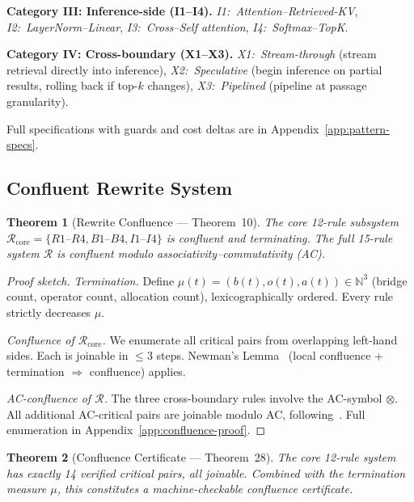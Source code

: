 \documentclass{article}
\newtheorem{theorem}{Theorem}
\theoremstyle{definition}
\theoremstyle{remark}
\begin{document}
\smallskip\noindent\textbf{Category III: Inference-side (I1--I4).}
\emph{I1:~Attention--Retrieved-KV}, \emph{I2:~LayerNorm--Linear}, \emph{I3:~Cross--Self attention}, \emph{I4:~Softmax--TopK}.

\smallskip\noindent\textbf{Category IV: Cross-boundary (X1--X3).}
\emph{X1:~Stream-through} (stream retrieval directly into inference),
\emph{X2:~Speculative} (begin inference on partial results, rolling back if top-$k$ changes),
\emph{X3:~Pipelined} (pipeline at passage granularity).

Full specifications with guards and cost deltas are in Appendix~\ref{app:pattern-specs}.

\subsection{Confluent Rewrite System}\label{sec:confluence}

\begin{theorem}[Rewrite Confluence --- Theorem~10]\label{thm:confluence}
The core 12-rule subsystem $\mathcal{R}_{\mathrm{core}} = \{R1\text{--}R4, B1\text{--}B4, I1\text{--}I4\}$ is confluent and terminating.
The full 15-rule system $\mathcal{R}$ is confluent modulo associativity--commutativity (AC).
\end{theorem}

\begin{proof}[Proof sketch]
\emph{Termination.}
Define $\mu(t) = (b(t), o(t), a(t)) \in \mathbb{N}^3$ (bridge count, operator count, allocation count), lexicographically ordered. Every rule strictly decreases $\mu$.

\emph{Confluence of $\mathcal{R}_{\mathrm{core}}$.}
We enumerate all critical pairs from overlapping left-hand sides. Each is joinable in $\leq 3$ steps. Newman's Lemma~\cite{newman1942theories} (local confluence + termination $\Rightarrow$ confluence) applies.

\emph{AC-confluence of $\mathcal{R}$.}
The three cross-boundary rules involve the AC-symbol $\otimes$. All additional AC-critical pairs are joinable modulo AC, following~\cite{peterson1981accompletion}. Full enumeration in Appendix~\ref{app:confluence-proof}.
\end{proof}

\begin{theorem}[Confluence Certificate --- Theorem~28]\label{thm:confluence-cert}
The core 12-rule system has exactly 14 verified critical pairs, all joinable. Combined with the termination measure $\mu$, this constitutes a machine-checkable confluence certificate.
\end{theorem}
\end{document}
